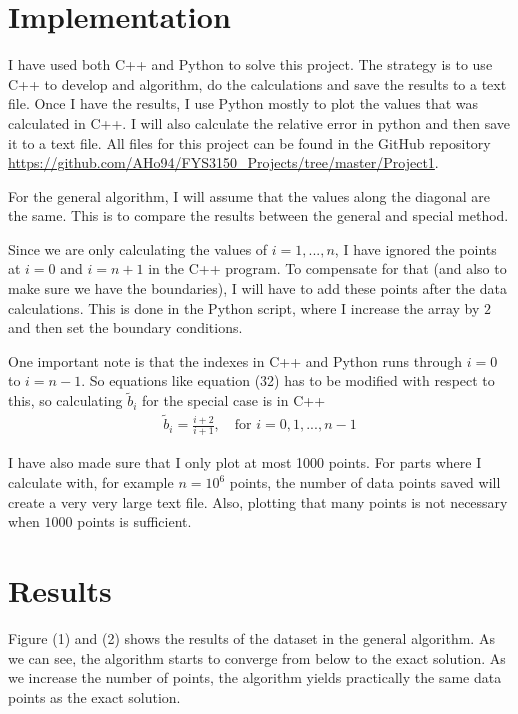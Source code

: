 \documentclass[12pt]{article}
\begin{document}
\section{Implementation}
I have used both C++ and Python to solve this project. The strategy is to use C++ to develop and algorithm, do the calculations and save the results to a text file. Once I have the results, I use Python mostly to plot the values that was calculated in C++. I will also calculate the relative error in python and then save it to a text file. All files for this project can be found in the GitHub repository \url{https://github.com/AHo94/FYS3150_Projects/tree/master/Project1}.

For the general algorithm, I will assume that the values along the diagonal are the same. This is to compare the results between the general and special method.

Since we are only calculating the values of $i=1,...,n$, I have ignored the points at $i=0$ and $i=n+1$ in the C++ program. To compensate for that (and also to make sure we have the boundaries), I will have to add these points after the data calculations. This is done in the Python script, where I increase the array by $2$ and then set the boundary conditions.

One important note is that the indexes in C++ and Python runs through $i=0$ to $i=n-1$. So equations like equation (32) has to be modified with respect to this, so calculating   $\tilde{b}_i$ for the special case is in C++
\begin{align}
\tilde{b}_i = \frac{i+2}{i+1}, \quad \text{for } i=0,1,...,n-1
\end{align}

I have also made sure that I only plot at most 1000 points. For parts where I calculate with, for example $n=10^6$ points, the number of data points saved will create a very very large text file. Also, plotting that many points is not necessary when $1000$ points is sufficient.

\section{Results}
Figure (1) and (2) shows the results of the dataset in the general algorithm. As we can see, the algorithm starts to converge from below to the exact solution. As we increase the number of points, the algorithm yields practically the same data points as the exact solution.
\end{document}
